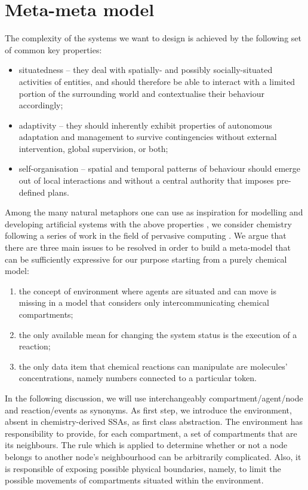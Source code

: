 \documentclass[12pt,a4paper,twoside,openright]{book}
\begin{document}
\section{Meta-meta model}
\label{meta-meta-model}
The complexity of the systems we want to design is achieved by the following set of common key properties:
\begin{itemize}
 \item situatedness -- they deal with spatially- and possibly socially-situated activities of entities, and should therefore be able to interact with a limited portion of the surrounding world and contextualise their behaviour accordingly; 
 \item adaptivity -- they should inherently exhibit properties of autonomous adaptation and management to survive contingencies without external intervention, global supervision, or both; 
 \item self-organisation -- spatial and temporal patterns of behaviour should emerge out of local interactions and without a central authority that imposes pre-defined plans.
\end{itemize}

Among the many natural metaphors one can use as inspiration for modelling and developing artificial systems with the above properties \cite{ecosystems-jpcc7}, we consider chemistry following a series of work in the field of pervasive computing \cite{VCMZ-TAAS2011,VZ-INS2010,sapere-procedia7}. 
%
We argue that there are three main issues to be resolved in order to build a meta-model that can be sufficiently expressive for our purpose starting from a purely chemical model:
\begin{enumerate}
 \item the concept of environment where agents are situated and can move is missing in a model that considers only intercommunicating chemical compartments;
 \item the only available mean for changing the system status is the execution of a reaction;
 \item the only data item that chemical reactions can manipulate are molecules' concentrations, namely numbers connected to a particular token.
\end{enumerate}

In the following discussion, we will use interchangeably compartment/agent/node and reaction/events as synonyms.
%
As first step, we introduce the environment, absent in chemistry-derived SSAs, as first class abstraction.
%
The environment has responsibility to provide, for each compartment, a set of compartments that are its neighbours.
%
The rule which is applied to determine whether or not a node belongs to another node's neighbourhood  can be arbitrarily complicated.
%
Also, it is responsible of exposing possible physical boundaries, namely, to limit the possible movements of compartments situated within the environment.
\end{document}
